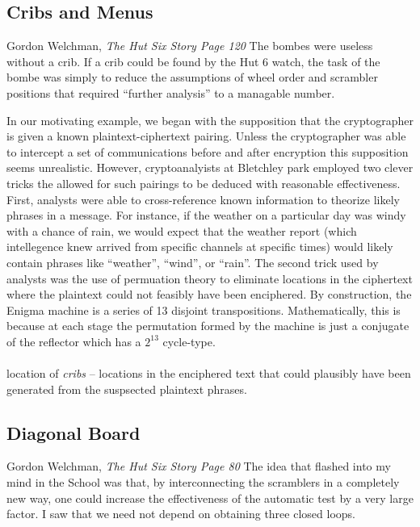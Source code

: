 \subsection{Cribs and Menus}

\begin{chapquote}{Gordon Welchman, \textit{The Hut Six Story Page 120}}
  The bombes were useless without a crib. If a crib could be found by
  the Hut 6 watch, the task of the bombe was simply to reduce the
  assumptions of wheel order and scrambler positions that required
  ``further analysis'' to a managable number.
\end{chapquote}

In our motivating example, we began with the supposition that the
cryptographer is given a known plaintext-ciphertext pairing. Unless
the cryptographer was able to intercept
a set of communications before and after encryption this supposition
seems unrealistic. However, cryptoanalyists at Bletchley park
employed two clever tricks the allowed for such pairings to be
deduced with reasonable effectiveness. First, analysts were able to
cross-reference known information to theorize likely phrases in a
message. For instance, if the weather on a particular day was windy
with a chance of rain, we would expect that the weather report (which
intellegence knew arrived from specific channels at specific times)
would likely contain phrases like ``weather'', ``wind'', or ``rain''.
The second trick used by analysts was the use of permuation theory to
eliminate locations in the ciphertext where the plaintext could not
feasibly have been enciphered. By construction, the Enigma machine is
a series of 13 disjoint transpositions. Mathematically, this is
because at each stage the permutation formed by the machine is just a
conjugate of the reflector which has a $2^{13}$ cycle-type.
\\\\ location of \emph{cribs} -- locations in the enciphered text
that could plausibly have been generated from the suspsected plaintext phrases.

\subsection{Diagonal Board}

\begin{chapquote}{Gordon Welchman, \textit{The Hut Six Story Page 80}}
  The idea that flashed into my mind in the School was that, by
  interconnecting the scramblers in a completely new way, one could
  increase the effectiveness of the automatic test by a very large
  factor. I saw that we need not depend on obtaining three closed loops.
\end{chapquote}
